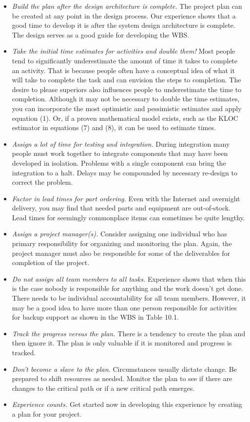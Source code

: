 \begin{itemize}
\item
  \emph{Build the plan after the design architecture is complete.} The
  project plan can be created at any point in the design process. Our
  experience shows that a good time to develop it is after the system
  design architecture is complete. The design serves as a good guide for
  developing the WBS.
\item
  \emph{Take the initial time estimates for activities and double them!}
  Most people tend to significantly underestimate the amount of time it
  takes to complete an activity. That is because people often have a
  conceptual idea of what it will take to complete the task and can
  envision the steps to completion. The desire to please superiors also
  influences people to underestimate the time to completion. Although it
  may not be necessary to double the time estimates, you can incorporate
  the most optimistic and pessimistic estimates and apply equation (1).
  Or, if a proven mathematical model exists, such as the KLOC estimator
  in equations (7) and (8), it can be used to estimate times.
\item
  \emph{Assign a lot of time for testing and integration.} During
  integration many people must work together to integrate components
  that may have been developed in isolation. Problems with a single
  component can bring the integration to a halt. Delays may be
  compounded by necessary re-design to correct the problem.
\item
  \emph{Factor in lead times for part ordering.} Even with the Internet
  and overnight delivery, you may find that needed parts and equipment
  are out-of-stock. Lead times for seemingly commonplace items can
  sometimes be quite lengthy.
\item
  \emph{Assign a project manager(s).} Consider assigning one individual
  who has primary responsibility for organizing and monitoring the plan.
  Again, the project manager must also be responsible for some of the
  deliverables for completion of the project.
\item
  \emph{Do not assign all team members to all tasks.} Experience shows
  that when this is the case nobody is responsible for anything and the
  work doesn't get done. There needs to be individual accountability for
  all team members. However, it may be a good idea to have more than one
  person responsible for activities for backup support as shown in the
  WBS in Table 10.1.
\item
  \emph{Track the progress versus the plan.} There is a tendency to
  create the plan and then ignore it. The plan is only valuable if it is
  monitored and progress is tracked.
\item
  \emph{Don't become a slave to the plan.} Circumstances usually dictate
  change. Be prepared to shift resources as needed. Monitor the plan to
  see if there are changes to the critical path or if a new critical
  path emerges.
\item
  \emph{Experience counts.} Get started now in developing this
  experience by creating a plan for your project.
\end{itemize}

